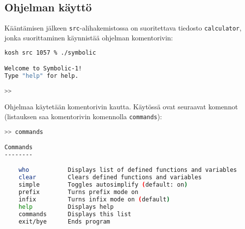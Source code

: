 \documentclass[10pt,a4paper]{article}
\begin{document}
\subsection{Ohjelman käyttö}
Kääntämisen jälkeen \texttt{src}-alihakemistossa on suoritettava tiedosto \texttt{calculator},
jonka suorittaminen käynnistää ohjelman komentorivin:
\begin{lstlisting}[language=bash]
kosh src 1057 % ./symbolic

Welcome to Symbolic-1!
Type "help" for help.

>>
\end{lstlisting}
Ohjelmaa käytetään komentorivin kautta. Käytössä ovat seuraavat komennot (listauksen saa
komentorivin komennolla \texttt{commands}):
\begin{lstlisting}[language=bash]
>> commands

Commands
--------

    who           Displays list of defined functions and variables
    clear         Clears defined functions and variables
    simple        Toggles autosimplify (default: on)
    prefix        Turns prefix mode on
    infix         Turns infix mode on (default)
    help          Displays help
    commands      Displays this list
    exit/bye      Ends program

\end{lstlisting}
\end{document}

